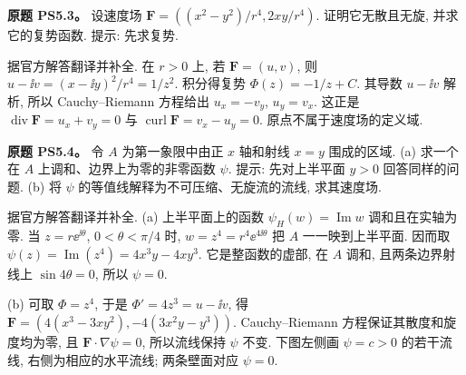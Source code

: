 \begin{exercise}
\textbf{原题 PS5.3。}\label{ass:ps5-3}
设速度场 $\mathbf F=((x^2-y^2)/r^4,2xy/r^4)$. 证明它无散且无旋, 并求它的复势函数. 提示: 先求复势.
\end{exercise}
\begin{solution}
据官方解答翻译并补全. 在 $r>0$ 上, 若 $\mathbf F=(u,v)$, 则
$u-\ii v=(x-\ii y)^2/r^4=1/z^2$. 积分得复势 $\Phi(z)=-1/z+C$.
其导数 $u-\ii v$ 解析, 所以 Cauchy--Riemann 方程给出 $u_x=-v_y$, $u_y=v_x$. 这正是 $\operatorname{div}\mathbf F=u_x+v_y=0$ 与 $\operatorname{curl}\mathbf F=v_x-u_y=0$. 原点不属于速度场的定义域.
\end{solution}

\begin{exercise}
\textbf{原题 PS5.4。}\label{ass:ps5-4}
令 $A$ 为第一象限中由正 $x$ 轴和射线 $x=y$ 围成的区域.
(a) 求一个在 $A$ 上调和、边界上为零的非零函数 $\psi$. 提示: 先对上半平面 $y>0$ 回答同样的问题.
(b) 将 $\psi$ 的等值线解释为不可压缩、无旋流的流线, 求其速度场.
\end{exercise}
\begin{solution}
据官方解答翻译并补全. (a) 上半平面上的函数 $\psi_H(w)=\operatorname{Im}w$ 调和且在实轴为零. 当 $z=r\ee^{\ii\theta}$, $0<\theta<\pi/4$ 时, $w=z^4=r^4\ee^{4\ii\theta}$ 把 $A$ 一一映到上半平面. 因而取 $\psi(z)=\operatorname{Im}(z^4)=4x^3y-4xy^3$. 它是整函数的虚部, 在 $A$ 调和, 且两条边界射线上 $\sin4\theta=0$, 所以 $\psi=0$.

(b) 可取 $\Phi=z^4$, 于是 $\Phi'=4z^3=u-\ii v$, 得
$\mathbf F=(4(x^3-3xy^2),-4(3x^2y-y^3))$.
Cauchy--Riemann 方程保证其散度和旋度均为零, 且 $\mathbf F\cdot\nabla\psi=0$, 所以流线保持 $\psi$ 不变. 下图左侧画 $\psi=c>0$ 的若干流线, 右侧为相应的水平流线; 两条壁面对应 $\psi=0$.
\begin{center}
\end{center}
\end{solution}

